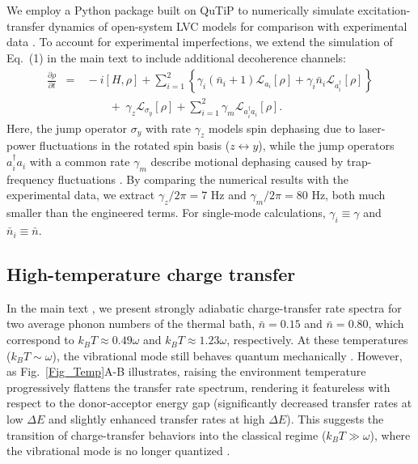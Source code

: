 \documentclass[
reprint,
superscriptaddress,

amsmath,amssymb,
aps,
prl,

floatfix,
]{revtex4-2}
\begin{document}
We employ a Python package built on QuTiP \cite{johansson2013qutip} to numerically simulate excitation-transfer dynamics of open-system LVC models for comparison with experimental data \cite{so2024electrontransfer,so2025multimode}. To account for experimental imperfections, we extend the simulation of Eq.~(1) in the main text \cite{so2025fT} to include additional decoherence channels:
\begin{eqnarray}
\frac{\partial\rho}{\partial t}\!\!\!&=&\!\!\!-i[H,\rho] +\! \sum_{i=1}^2\left\{\gamma_i (\bar{n}_i+1)\mathcal{L}_{a_i}[\rho] + \gamma_i \bar{n}_i \mathcal{L}_{a_i^\dagger}[\rho]\right\} \nonumber \\
&\quad& \quad\quad+\;\gamma_z\mathcal{L}_{\sigma_y}[\rho]+\sum_{i=1}^2\gamma_{m}\mathcal{L}_{a_i^\dagger a_i}[\rho].
\label{eq_master_mod}
\end{eqnarray}
Here, the jump operator $\sigma_y$ with rate $\gamma_z$ models spin dephasing due to laser-power fluctuations in the rotated spin basis ($z \leftrightarrow y$), while the jump operators $a_i^\dagger a_i$ with a common rate $\gamma_{m}$ describe motional dephasing caused by trap-frequency fluctuations \cite{so2025multimode}. By comparing the numerical results with the experimental data, we extract $\gamma_z/2\pi = 7$ Hz and $\gamma_{m}/2\pi = 80$ Hz, both much smaller than the engineered terms. For single-mode calculations, $\gamma_i\equiv\gamma$ and $\bar{n}_i\equiv\bar{n}$.

\subsection*{High-temperature charge transfer} \label{app_opt}

In the main text \cite{so2025fT}, we present strongly adiabatic charge-transfer rate spectra for two average phonon numbers of the thermal bath, $\bar{n}=0.15$ and $\bar{n}=0.80$, which correspond to $k_B T\approx0.49\omega$ and $k_B T\approx1.23\omega$, respectively. At these temperatures ($k_B T\sim\omega$), the vibrational mode still behaves quantum mechanically  \cite{schlawin2021electrontransfer}. However, as Fig.~\ref{Fig_Temp}A-B illustrates, raising the environment temperature progressively flattens the transfer rate spectrum, rendering it featureless with respect to the donor-acceptor energy gap (significantly decreased transfer rates at low $\Delta E$ and slightly enhanced transfer rates at high $\Delta E$). This suggests the transition of charge-transfer behaviors into the classical regime ($k_B T\gg\omega$), where the vibrational mode is no longer quantized \cite{schlawin2021electrontransfer}.
\end{document}
